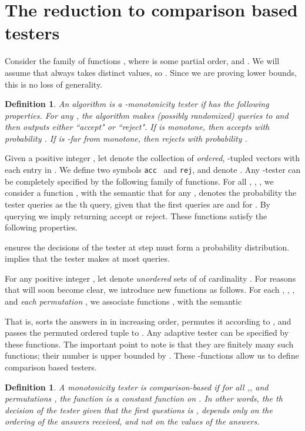 \documentclass[11pt]{article}
\newtheorem{definition}[theorem]{Definition}
\def\x{{\bf x}}
\newcommand{\acc}{\hbox{acc}}
\newcommand{\rej}{\hbox{rej}}
\begin{document}
\section{The reduction to comparison based testers} \label{sec:prelim}

Consider the family of functions , where  is some partial order, and .
We will assume that  always takes distinct values, so . Since we are proving
lower bounds, this is no loss of generality.

\begin{definition} \label{def:tester}
An algorithm  is a \emph{-monotonicity tester}
if  has the following properties. For any , the algorithm  makes  (possibly randomized) queries to 
and then outputs either ``accept" or ``reject". If  is monotone, then  accepts with probability .
If  is -far from monotone, then  rejects with probability .
\end{definition}
\def\acc{{\tt acc}}
\def\rej{{\tt rej}}
\def\x{{\mathbf x}}
\def\a{{\mathbf a}}


Given a positive integer , let  denote the collection of {\em ordered}, -tupled vectors with each entry in .
We define two symbols \acc~ and \rej, and denote .
Any -tester can be completely specified by the following family of functions.
For all , , , we consider a function , with the semantic that for any ,  denotes the probability the tester queries  as the th query, given that the 
first  queries are  and  for . By querying  we imply returning accept or reject. These functions satisfy the following properties.


 ensures the decisions of the tester at step  must form a probability distribution.  implies that the tester makes at most  queries.


For any positive integer , let  denote {\em unordered} sets of  of cardinality . For reasons that will soon become clear, we introduce new functions as follows. For each ,  , , and {\em each permutation} , we associate functions , with the semantic


That is,  sorts the answers in  in increasing order, permutes it according to , and passes the permuted ordered tuple to . Any adaptive tester can be specified by these functions. The important point to note is that they are finitely many such functions; their number is upper bounded by . These -functions allow us to define comparison based testers.


\begin{definition} \label{def:comp}
A monotonicity tester  is \emph{comparison-based} if for all ,, and permutations , the function  is a constant function on . 
In other words, the th decision of the tester given that the first  questions is , depends only on the {\em ordering} of the answers received, and not on the values of the answers.
\end{definition}
\end{document}
